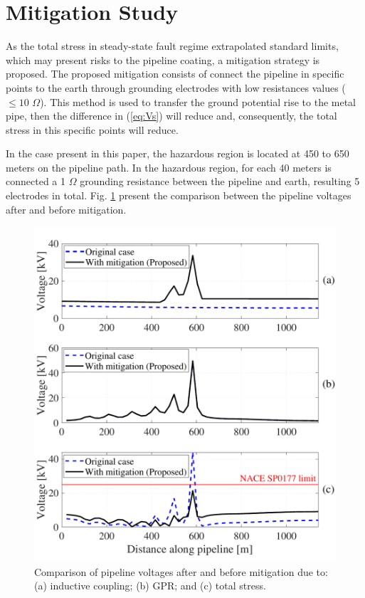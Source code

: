 \documentclass{IEEEtran4PSCC}
\begin{document}
\section{Mitigation Study}

As the total stress in steady-state fault regime extrapolated standard limits, which may present risks to the pipeline coating, a mitigation strategy is proposed. The proposed mitigation consists of connect the pipeline in specific points to the earth through grounding electrodes with low resistances values ($\leq 10$ $\Omega$). This method is used to transfer the ground potential rise to the metal pipe, then the difference in (\ref{eq:Vs}) will reduce and, consequently, the total stress in this specific points will reduce. 

In the case present in this paper, the hazardous region is located at 450 to 650 meters on the pipeline path. In the hazardous region, for each 40 meters is connected a 1 $\Omega$ grounding resistance between the pipeline and earth, resulting 5 electrodes in total. Fig. \ref{fig:Mitvoltage} present the comparison between the pipeline voltages after and before mitigation.    

\begin{figure}[hbt]
	\begin{center}
		\includegraphics[width=1\columnwidth]{./fig/Mit_voltage2.pdf}
		\caption{Comparison of pipeline voltages after and before mitigation due to: (a) inductive coupling; (b) GPR; and (c) total stress.}
		\label{fig:Mitvoltage}
	\end{center}
\end{figure}
\end{document}

